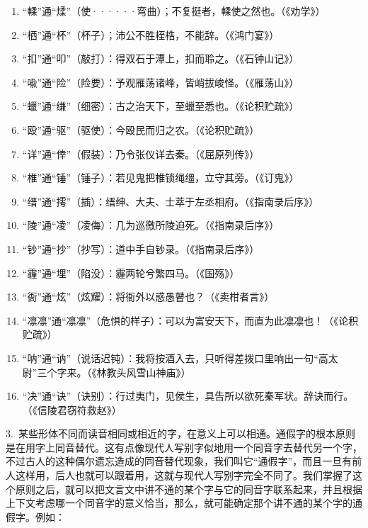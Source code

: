 \begin{enumerate}[label=\textcircled{\arabic*}]
\item “輮”通“煣”（使······弯曲）；不复挺者，輮使之然也。（《劝学》）
\item “栖”通“杯”（杯子）；沛公不胜桎梏，不能辞。（《鸿门宴》）
\item “扣”通“叩”（敲打）：得双石于潭上，扣而聆之。（《石钟山记》）
\item “喩”通“险”（险要）：予观雁荡诸峰，皆峭拔峻怪。（《雁荡山》）
\item “蠟”通“缣”（细密）：古之治天下，至蠟至悉也。（《论积贮疏》）
\item “殴”通“驱”（驱使）：今殴民而归之农。（《论积贮疏》）
\item “详”通“倖”（假装）：乃令张仪详去秦。（《屈原列传》）
\item “椎”通“锤”（锤子）：若见鬼把椎锁绳缰，立守其旁。（《订鬼》）
\item “缙”通“摴”（插）：缙绅、大夫、士萃于左丞相府。（《指南录后序》）
\item “陵”通“凌”（凌侮）：几为巡徼所陵迫死。（《指南录后序》）
\item “钞”通“抄”（抄写）：道中手自钞录。（《指南录后序》）
\item “霾”通“埋”（陷没）：霾两轮兮繁四马。（《国殇》）
\item “衙”通“炫”（炫耀）：将衙外以惑愚瞽也？（《卖柑者言》）
\item “凛凛”通“凛凛”（危惧的样子）：可以为富安天下，而直为此凛凛也！（《论积贮疏》）
\item “呐”通“讷”（说话迟钝）：我将按酒入去，只听得差拨口里响出一句“高太尉”三个字来。（《林教头风雪山神庙》）
\item “决”通“诀”（诀别）：行过夷门，见侯生，具告所以欲死秦军状。辞诀而行。（《信陵君窃符救赵》）
\end{enumerate}

3.\ 某些形体不同而读音相同或相近的字，在意义上可以相通。通假字的根本原则是在用字上同音替代。这有点像现代人写别字似地用一个同音字去替代另一个字，不过古人的这种偶尔遗忘造成的同音替代现象，我们叫它“通假字”，而且一旦有前人这样用，后人也就可以跟着用，这就与现代人写别字完全不同了。我们掌握了这个原则之后，就可以把文言文中讲不通的某个字与它的同音字联系起来，并且根据上下文考虑哪一个同音字的意义恰当，那么，就可能确定那个讲不通的某个字的通假字。例如：


